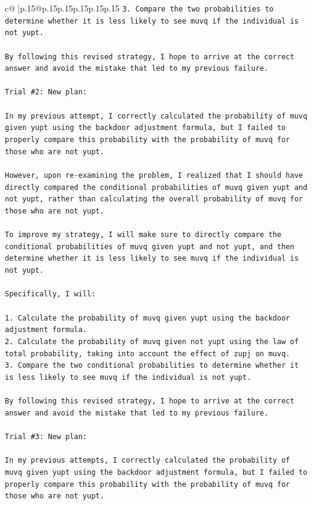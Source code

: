 \documentclass{article}
\begin{document}
{\begin{supertabular}{c@{$\;$}|p{.15\linewidth}@{}p{.15\linewidth}p{.15\linewidth}p{.15\linewidth}p{.15\linewidth}p{.15\linewidth}}
{{{\texttt{3. Compare the two probabilities to determine whether it is less likely to see muvq if the individual is not yupt.} \\
\\ 
\texttt{By following this revised strategy, I hope to arrive at the correct answer and avoid the mistake that led to my previous failure.} \\
\\ 
\texttt{Trial \#2: New plan: } \\
\\ 
\texttt{In my previous attempt, I correctly calculated the probability of muvq given yupt using the backdoor adjustment formula, but I failed to properly compare this probability with the probability of muvq for those who are not yupt. } \\
\\ 
\texttt{However, upon re{-}examining the problem, I realized that I should have directly compared the conditional probabilities of muvq given yupt and not yupt, rather than calculating the overall probability of muvq for those who are not yupt. } \\
\\ 
\texttt{To improve my strategy, I will make sure to directly compare the conditional probabilities of muvq given yupt and not yupt, and then determine whether it is less likely to see muvq if the individual is not yupt. } \\
\\ 
\texttt{Specifically, I will:} \\
\\ 
\texttt{1. Calculate the probability of muvq given yupt using the backdoor adjustment formula.} \\
\texttt{2. Calculate the probability of muvq given not yupt using the law of total probability, taking into account the effect of zupj on muvq.} \\
\texttt{3. Compare the two conditional probabilities to determine whether it is less likely to see muvq if the individual is not yupt.} \\
\\ 
\texttt{By following this revised strategy, I hope to arrive at the correct answer and avoid the mistake that led to my previous failure.} \\
\\ 
\texttt{Trial \#3: New plan: } \\
\\ 
\texttt{In my previous attempts, I correctly calculated the probability of muvq given yupt using the backdoor adjustment formula, but I failed to properly compare this probability with the probability of muvq for those who are not yupt. } \\
}}}
\end{supertabular}}
\end{document}

